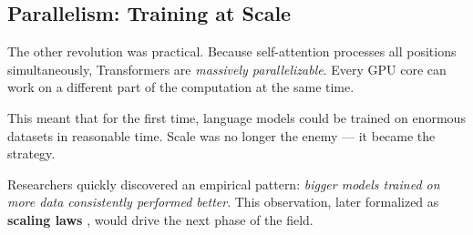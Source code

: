 \subsection{Parallelism: Training at Scale}

The other revolution was practical.
Because self-attention processes all positions simultaneously, Transformers are \emph{massively parallelizable}.
Every GPU core can work on a different part of the computation at the same time.

This meant that for the first time, language models could be trained on enormous datasets in reasonable time.
Scale was no longer the enemy --- it became the strategy.

Researchers quickly discovered an empirical pattern: \emph{bigger models trained on more data consistently performed better}.
This observation, later formalized as \textbf{scaling laws} \cite{kaplan2020scaling}, would drive the next phase of the field.
